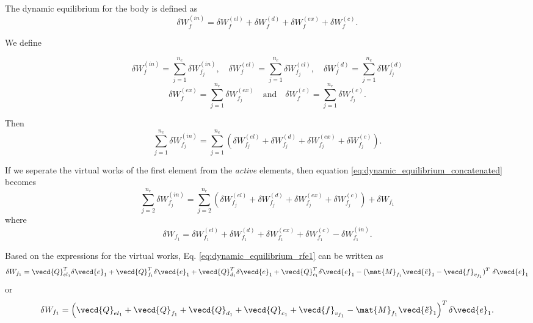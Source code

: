 The dynamic equilibrium for the body is defined as
\[
    \delta W_{f}^{(in)} = \delta W_{f}^{(el)} + 
    \delta W_{f}^{(d)} +  \delta W_{f}^{(ex)} + \delta W_{f}^{(c)}.
\]

We define 

\[
    \delta W_{f}^{(in)} = \sum_{j=1}^{n_{e}} \delta W_{f_{j}}^{(in)}, \quad 
    \delta W_{f}^{(el)} = \sum_{j=1}^{n_{e}} \delta W_{f_{j}}^{(el)}, \quad 
    \delta W_{f}^{(d)} = \sum_{j=1}^{n_{e}} \delta W_{f_{j}}^{(d)}
\]
\[
    \delta W_{f}^{(ex)} = \sum_{j=1}^{n_{e}} \delta W_{f_{j}}^{(ex)} \quad 
    \text{and} \quad
    \delta W_{f}^{(c)} = \sum_{j=1}^{n_{e}} \delta W_{f_{j}}^{(c)}.
\]

Then
\begin{equation}
    \sum_{j=1}^{n_{e}} \delta W_{f_{j}}^{(in)} = \sum_{j=1}^{n_{e}} \left(\delta W_{f_{j}}^{(el)} + 
    \delta W_{f_{j}}^{(d)} +  \delta W_{f_{j}}^{(ex)} + \delta W_{f_{j}}^{(c)}
    \right).
    \label{eq:dynamic_equilibrium_concatenated}
\end{equation}

If we seperate the virtual works of the first element from the \emph{active} 
elements, then equation \eqref{eq:dynamic_equilibrium_concatenated} becomes
\begin{equation}
    \sum_{j=2}^{n_{e}} \delta W_{f_{j}}^{(in)}
    = \sum_{j=2}^{n_{e}} \left(\delta W_{f_{j}}^{(el)} + 
    \delta W_{f_{j}}^{(d)} +  \delta W_{f_{j}}^{(ex)} + \delta W_{f_{j}}^{(c)}
    \right) + \delta W_{f_1}
    \label{eq:dynamic_equilibrium_split}
\end{equation}
where 
\begin{equation}
    \delta W_{f_1}  = \delta W_{f_{1}}^{(el)} + \delta W_{f_{1}}^{(d)} +
    \delta W_{f_{1}}^{(ex)} + \delta W_{f_{1}}^{(c)} - \delta W_{f_{1}}^{(in)}.
    \label{eq:dynamic_equilibrium_rfe1}
\end{equation}

Based on the expressions for the virtual works, Eq.
\eqref{eq:dynamic_equilibrium_rfe1} can be written as
\[
    \delta W_{f_1}  = \vecd{Q}_{{el}_{1}}^{T} \delta \vecd{e}_{1}
    + \vecd{Q}_{{f}_{1}}^{T} \delta \vecd{e}_{1}
    + \vecd{Q}_{{d}_{1}}^{T} \delta \vecd{e}_{1}
    + \vecd{Q}_{{c}_{1}}^{T} \delta \vecd{e}_{1}
    - (\mat{M}_{f_1} \vecd{\ddot{e}}_{1} - \vecd{f}_{v_{f_1}})^{T}\ 
    \delta \vecd{e}_{1}
\]
or 
\[
    \delta W_{f_1}  = \left(\vecd{Q}_{{el}_{1}} + \vecd{Q}_{{f}_{1}}
    + \vecd{Q}_{{d}_{1}} + \vecd{Q}_{{c}_{1}} + \vecd{f}_{v_{f_1}} -
    \mat{M}_{f_1} \vecd{\ddot{e}}_{1} \right)^{T} \delta \vecd{e}_{1}.
\]

